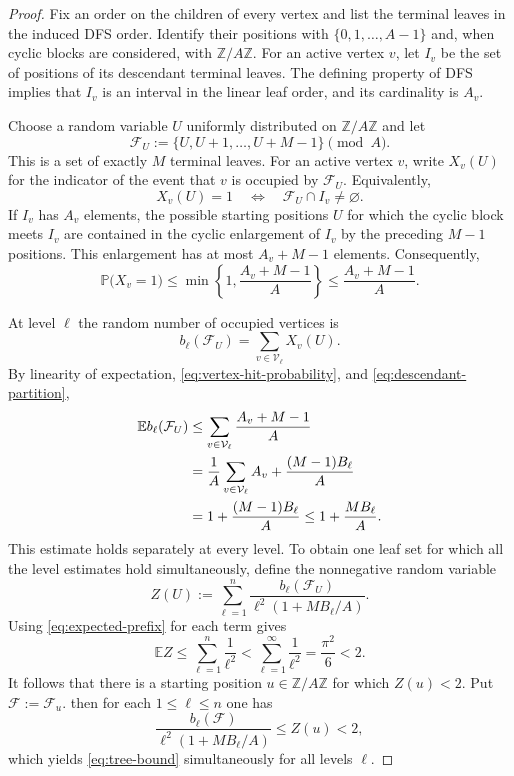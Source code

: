 \documentclass[12pt,letterpaper,reqno]{amsart}
\newcommand{\Z}{\mathbb Z}
\theoremstyle{definition}
\theoremstyle{remark}
\numberwithin{equation}{section}
\begin{document}
	\begin{proof}
		Fix an order on the children of every vertex and list the terminal leaves in
		the induced DFS order.  Identify their positions with
		$\{0,1,\ldots,A-1\}$ and, when cyclic blocks are considered, with
		$\Z/A\Z$.  For an active vertex $v$, let $I_v$ be the set of positions of
		its descendant terminal leaves.  The defining property of DFS implies that
		$I_v$ is an interval in the linear leaf order, and its cardinality is $A_v$.

		Choose a random variable $U$ uniformly distributed on $\Z/A\Z$ and let
		\[
			\mathcal F_U
			:=
			\{U,U+1,\ldots,U+M-1\}\pmod A.
		\]
		This is a set of exactly $M$ terminal leaves.  For an active vertex $v$,
		write $X_v(U)$ for the indicator of the event that $v$ is occupied by
		$\mathcal F_U$.  Equivalently,
		\[
			X_v(U)=1
			\quad\Longleftrightarrow\quad
			\mathcal F_U\cap I_v\neq\varnothing.
		\]
		If $I_v$ has $A_v$ elements, the possible starting positions $U$ for which
		the cyclic block meets $I_v$ are contained in the cyclic enlargement of
		$I_v$ by the preceding $M-1$ positions.  This enlargement has at most
		$A_v+M-1$ elements.  Consequently,
		\begin{equation}
			\mathbb P\bigl(X_v=1\bigr)
			\leq
			\min\left\{1,\frac{A_v+M-1}{A}\right\}
			\leq
			\frac{A_v+M-1}{A}.
			\label{eq:vertex-hit-probability}
		\end{equation}

		At level $\ell$ the random number of occupied vertices is
		\[
			b_\ell(\mathcal F_U)
			=
			\sum_{v\in\mathcal V_\ell}X_v(U).
		\]
		By linearity of expectation, \eqref{eq:vertex-hit-probability}, and
		\eqref{eq:descendant-partition},
		\begin{align}
			\mathbb E b_\ell(\mathcal F_U)
			&\leq
			\sum_{v\in\mathcal V_\ell}
			\frac{A_v+M-1}{A}\notag\\
			&=
			\frac{1}{A}\sum_{v\in\mathcal V_\ell}A_v
			+\frac{(M-1)B_\ell}{A}\notag\\
			&=
			1+\frac{(M-1)B_\ell}{A}
			\leq
			1+\frac{MB_\ell}{A}.
			\label{eq:expected-prefix}
		\end{align}
		This estimate holds separately at every level.  To obtain one leaf set for
		which all the level estimates hold simultaneously, define the nonnegative
		random variable
		\[
			Z(U)
			:=
			\sum_{\ell=1}^n
			\frac{b_\ell(\mathcal F_U)}
			{\ell^2(1+MB_\ell/A)}.
		\]
		Using \eqref{eq:expected-prefix} for each term gives
		\[
			\mathbb E Z
			\leq
			\sum_{\ell=1}^n\frac1{\ell^2}
			<
			\sum_{\ell=1}^{\infty}\frac1{\ell^2}
			=
			\frac{\pi^2}{6}<2.
		\]
		It follows that there is a starting position $u\in\Z/A\Z$ for which
		$Z(u)<2$.  Put $\mathcal F:=\mathcal F_u$. then for each $1\leq\ell\leq n$ one has
		\[
			\frac{b_\ell(\mathcal F)}
			{\ell^2(1+MB_\ell/A)}
			\leq Z(u)<2,
		\]
		which yields \eqref{eq:tree-bound} simultaneously for
		all levels $\ell$.
	\end{proof}
	
\end{document}
